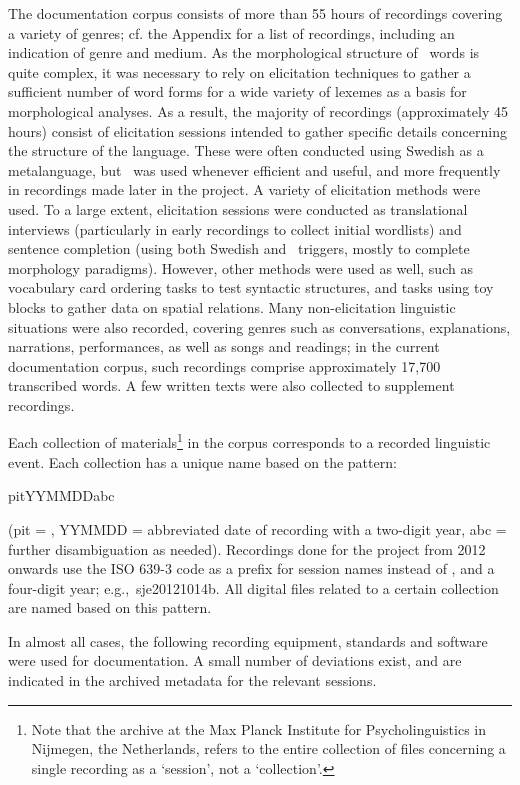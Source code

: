 The documentation corpus consists of more than 55 hours of recordings covering a variety of genres; cf. the Appendix for a list of recordings, including an indication of genre and medium. 
As the morphological structure of \PS\ words is quite complex, %
it was necessary to rely on elicitation techniques to gather a sufficient number of word forms for a wide variety of lexemes as a basis for morphological analyses. 
As a result, the majority of recordings (approximately 45 hours) consist of elicitation sessions intended to gather specific details concerning the structure of the language. 
These were often conducted using Swedish as a metalanguage, but \PS\ was used whenever efficient and useful, and more frequently in recordings made later in the project. 
A variety of elicitation methods were used. To a large extent, elicitation sessions were conducted as translational interviews (particularly in early recordings to collect initial wordlists) and sentence completion (using both Swedish and \PS\ triggers, mostly to complete morphology paradigms). However, other methods were used as well, such as vocabulary card ordering tasks to test syntactic structures, and tasks using toy blocks to gather data on spatial relations. 
Many non-elicitation linguistic situations were also recorded, covering genres such as conversations, explanations, narrations, performances, as well as songs and readings; in the current documentation corpus, such recordings comprise approximately 17,700 transcribed words. A few written texts were also collected to supplement recordings. 

Each collection of materials\footnote{Note that the archive at the Max Planck Institute for Psycholinguistics in Nijmegen, the Netherlands, refers to the entire collection of files concerning a single recording as a ‘session’, not a ‘collection’.} 
in the corpus corresponds to a recorded linguistic event. Each collection has a unique name based on the pattern:
\begin{center} pitYYMMDDabc \end{center}
(pit = \PS, YYMMDD = abbreviated date of recording with a two-digit year, abc = further disambiguation as needed). Recordings done for the project from 2012 onwards use the ISO 639-3 code  as a prefix for session names instead of , and a four-digit year; e.g.,~{sje2012}1014b. 
All digital files related to a certain collection are named based on this pattern. 

In almost all cases, the following recording equipment, standards and software were used for documentation. A small number of deviations exist, and are indicated in the archived metadata for the relevant sessions. 
 
